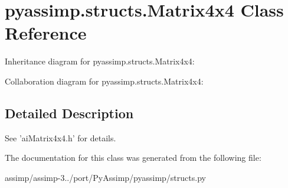 \hypertarget{classpyassimp_1_1structs_1_1_matrix4x4}{\section{pyassimp.\+structs.\+Matrix4x4 Class Reference}
\label{classpyassimp_1_1structs_1_1_matrix4x4}
}


Inheritance diagram for pyassimp.\+structs.\+Matrix4x4\+:


Collaboration diagram for pyassimp.\+structs.\+Matrix4x4\+:


\subsection{Detailed Description}
\begin{DoxyVerb}See 'aiMatrix4x4.h' for details.
\end{DoxyVerb}
 

The documentation for this class was generated from the following file\+:\begin{DoxyCompactItemize}
\item 
assimp/assimp-\/3../port/\+Py\+Assimp/pyassimp/structs.\+py\end{DoxyCompactItemize}
